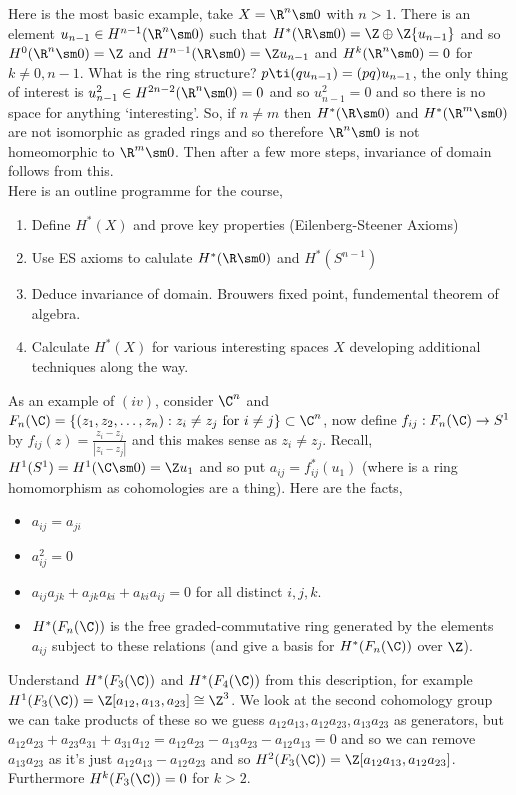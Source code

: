 \noindent
Here is the most basic example, take $X = \R^n \sm 0$ with $n > 1$. There is an element $u_{n-1} \in H^{n-1}(\R^n\sm 0)$ such that $H^*(\R\sm 0) = \Z \oplus \Z{u_{n-1}}$ and so $H^0(\R^n\sm 0) = \Z$ and $H^{n-1}(\R\sm 0) = \Z u_{n-1}$ and $H^k(\R^n\sm 0) = 0$ for $k \ne 0, n-1$. What is the ring structure?
$p \ti (qu_{n-1}) = (pq)u_{n-1}$, the only thing of interest is $u_{n-1}^2 \in H^{2n - 2}(\R^n \sm 0) = 0$ and so $u_{n-1}^2 = 0$ and so there is no space for anything `interesting'. So, if $n \ne m$ then $H^*(\R \sm 0)$ and $H^*(\R^m \sm 0)$ are not isomorphic as graded rings and so therefore $\R^n\sm 0$ is not homeomorphic to $\R^m\sm 0$. Then after a few more steps, invariance of domain follows from this.\\

\noindent
Here is an outline programme for the course,
\begin{enumerate}
  \item Define $H^*(X)$ and prove key properties (Eilenberg-Steener Axioms)
  \item Use ES axioms to calulate $H^*(\R\sm 0)$ and $H^*(S^{n-1})$
  \item Deduce invariance of domain. Brouwers fixed point, fundemental theorem of algebra.
  \item Calculate $H^*(X)$ for various interesting spaces $X$ developing additional techniques along the way.
\end{enumerate}
As an example of $(iv)$, consider $\C^n$ and $F_n(\C) = \{(z_1, z_2, \dots, z_n) : z_i \ne z_j \text{ for } i \ne j\} \subset \C^n$, now define $f_{ij} : F_n(\C) \to S^1$ by $f_{ij}(z) = \frac{z_i - z_j}{|z_i - z_j|}$ and this makes sense as $z_i \ne z_j$. Recall, $H^1(S^1) = H^1(\C\sm 0) = \Z u_1$ and so put $a_{ij} = f^{*}_{ij}(u_1)$ (where is a ring homomorphism as cohomologies are a thing). Here are the facts,
\begin{itemize}
  \item $a_{ij} = a_{ji}$
  \item $a_{ij}^2 = 0$
  \item $a_{ij}a_{jk} + a_{jk}a_{ki} + a_{ki}a_{ij} = 0$ for all distinct $i, j, k$.
  \item $H^*(F_n(\C))$ is the free graded-commutative ring generated by the elements $a_{ij}$ subject to these relations (and give a basis for $H^*(F_{n}(\C))$ over $\Z$).
\end{itemize}

\begin{exercise}
  Understand $H^*(F_3(\C))$ and $H^*(F_4(\C))$ from this description, for example $H^1(F_3(\C)) = \Z[a_{12}, a_{13}, a_{23}] \cong \Z^3$. We look at the second cohomology group we can take products of these so we guess $a_{12}a_{13}, a_{12}a_{23}, a_{13}a_{23}$ as generators, but $a_{12}a_{23} + a_{23}a_{31} + a_{31}a_{12} = a_{12}a_{23} - a_{13}a_{23} - a_{12}a_{13} = 0$ and so we can remove $a_{13}a_{23}$ as it's just $a_{12}a_{13} - a_{12}a_{23}$ and so $H^2(F_3(\C)) = \Z[a_{12}a_{13}, a_{12}a_{23}]$. Furthermore $H^k(F_3(\C)) = 0$ for $k > 2$.
\end{exercise}


